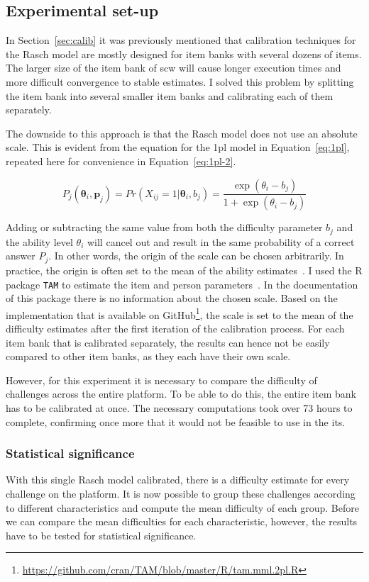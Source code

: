\subsection{Experimental set-up}
In Section~\ref{sec:calib} it was previously mentioned that calibration techniques for the Rasch model are mostly designed for item banks with several dozens of items.
The larger size of the item bank of \gls{scw} will cause longer execution times and more difficult convergence to stable estimates.
I solved this problem by splitting the item bank into several smaller item banks and calibrating each of them separately.

The downside to this approach is that the Rasch model does not use an absolute scale.
This is evident from the equation for the \gls{1pl} model in Equation~\ref{eq:1pl}, repeated here for convenience in Equation~\ref{eq:1pl-2}.

\begin{equation}
    \label{eq:1pl-2}
    P_{j}(\bm{\theta}_i,\bm{p}_j) =
    Pr(X_{ij} = 1 | \bm{\theta}_i,b_j) =
    \frac{\exp(\theta_i - b_j)}{1 + \exp(\theta_i - b_j)}
\end{equation}

Adding or subtracting the same value from both the difficulty parameter $b_j$ and the ability level $\theta_i$ will cancel out and result in the same probability of a correct answer $P_j$.
In other words, the origin of the scale can be chosen arbitrarily.
In practice, the origin is often set to the mean of the ability estimates~\cite{magis2017computerized}.
I used the R package \texttt{TAM} to estimate the item and person parameters~\cite{robitzsch2021package}.
In the documentation of this package there is no information about the chosen scale.
Based on the implementation that is available on GitHub\footnote{\url{https://github.com/cran/TAM/blob/master/R/tam.mml.2pl.R}}, the scale is set to the mean of the difficulty estimates after the first iteration of the calibration process.
For each item bank that is calibrated separately, the results can hence not be easily compared to other item banks, as they each have their own scale.

However, for this experiment it is necessary to compare the difficulty of challenges across the entire platform.
To be able to do this, the entire item bank has to be calibrated at once. 
The necessary computations took over 73 hours to complete, confirming once more that it would not be feasible to use in the \gls{its}.

\subsubsection{Statistical significance}
With this single Rasch model calibrated, there is a difficulty estimate for every challenge on the platform.
It is now possible to group these challenges according to different characteristics and compute the mean difficulty of each group.
Before we can compare the mean difficulties for each characteristic, however, the results have to be tested for statistical significance.

